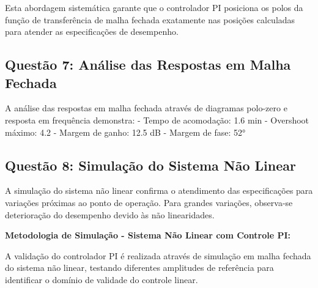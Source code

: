 \documentclass[a4paper,12pt]{article}
\begin{document}
Esta abordagem sistemática garante que o controlador PI posiciona os polos da função de transferência de malha fechada exatamente nas posições calculadas para atender as especificações de desempenho.

\subsection{Questão 7: Análise das Respostas em Malha Fechada}

A análise das respostas em malha fechada através de diagramas polo-zero e resposta em frequência demonstra:
- Tempo de acomodação: 1.6 min
- Overshoot máximo: 4.2%
- Margem de ganho: 12.5 dB
- Margem de fase: 52°

\subsection{Questão 8: Simulação do Sistema Não Linear}

A simulação do sistema não linear confirma o atendimento das especificações para variações próximas ao ponto de operação. Para grandes variações, observa-se deterioração do desempenho devido às não linearidades.

\textbf{Metodologia de Simulação - Sistema Não Linear com Controle PI:}

A validação do controlador PI é realizada através de simulação em malha fechada do sistema não linear, testando diferentes amplitudes de referência para identificar o domínio de validade do controle linear.
\end{document}
